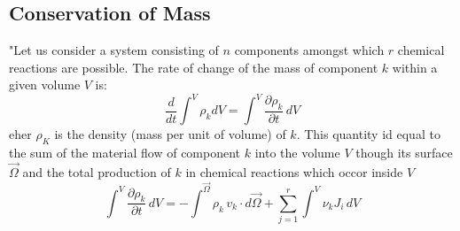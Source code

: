 \subsection{Conservation of Mass}

"Let us consider a system consisting of $n$ components amongst which $r$ chemical reactions are possible. 
The rate of change of the mass of component $k$ within a given volume $V$ is:
\begin{equation}
\frac{d}{dt}\int^V \rho_k dV = \int^V \frac{\partial \rho_k}{\partial t}\, dV
\label{dGM1}
\end{equation}
eher $\rho_K$ is the density (mass per unit of volume) of $k$. This quantity id equal to the sum of the material flow of component $k$ into the volume $V$ though its surface $\vec{\Omega}$ and the total production of $k$ in chemical reactions which occor inside $V$
\begin{equation}
\int^V \frac{\partial \rho_k}{\partial t}\, dV = - \int^\vec{\Omega} \rho_k\, v_k \cdot d\vec{\Omega} + \sum_{j=1}^r \int^V \nu_k J_i\, dV
\label{dGM2}
\end{equation}